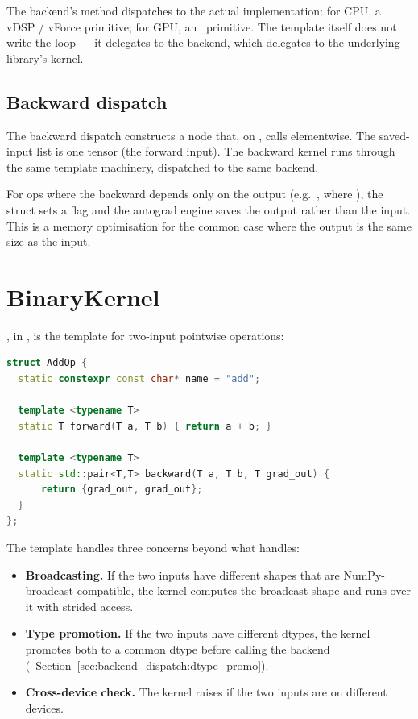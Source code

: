 The backend's  method dispatches to the actual
implementation: for CPU, a vDSP / vForce primitive; for GPU, an
\MLX\ primitive. The template itself does not write the loop --- it
delegates to the backend, which delegates to the underlying
library's kernel.

\subsection{Backward dispatch}
\label{ssec:kernel_abstraction:unary_backward}

The backward dispatch constructs a  node that, on
, calls  elementwise. The saved-input list is one tensor (the
forward input). The backward kernel runs through the same template
machinery, dispatched to the same backend.

For ops where the backward depends only on the output (e.g.\
, where ), the
\code{Op} struct sets a flag and the autograd engine saves the
output rather than the input. This is a memory optimisation for
the common case where the output is the same size as the input.

\section{BinaryKernel}
\label{sec:kernel_abstraction:binary}

, in ,
is the template for two-input pointwise operations:

\begin{lstlisting}[style=lucidcpp,language=C++]
struct AddOp {
  static constexpr const char* name = "add";

  template <typename T>
  static T forward(T a, T b) { return a + b; }

  template <typename T>
  static std::pair<T,T> backward(T a, T b, T grad_out) {
      return {grad_out, grad_out};
  }
};
\end{lstlisting}

The template handles three concerns beyond what 
handles:

\begin{itemize}
  \item \textbf{Broadcasting.} If the two inputs have different
    shapes that are NumPy-broadcast-compatible, the kernel
    computes the broadcast shape and runs over it with strided
    access.
  \item \textbf{Type promotion.} If the two inputs have different
    dtypes, the kernel promotes both to a common dtype before
    calling the backend (~Section~\ref{sec:backend_dispatch:dtype_promo}).
  \item \textbf{Cross-device check.} The kernel raises
     if the two inputs are on different devices.
\end{itemize}

